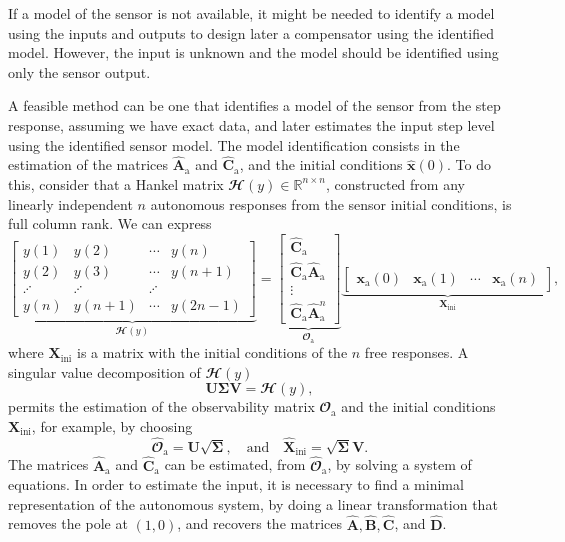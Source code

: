 If a model of the sensor is not available, it might be needed to identify a model using the inputs and outputs to design later a compensator using the identified model.
However, the input is unknown and the model should be identified using only the sensor output.


A feasible method can be one that identifies a model of the sensor from the step response, assuming we have exact data, and later estimates the input step level using the identified sensor model.
The model identification consists in the estimation of the matrices $\widehat{\mathbf{A}}_\text{a}$ and $\widehat{\mathbf{C}}_\text{a}$, and the initial conditions $\widehat{\mathbf{x}}(0)$.
To do this, consider that a Hankel matrix $\mathbfcal{H}({y}) \in \mathbb{R}^{n \times n}$, constructed from any linearly independent $n$ autonomous responses from the sensor initial conditions, is full column rank.
We can express 
\[ \underbrace{ \begin{bmatrix} y(1) & y(2) & \cdots & y(n) \\ y(2) & y(3) & \cdots & y(n+1) \\ \iddots & \iddots & \iddots \\ y(n) & y(n+1) & \cdots & y(2n-1) \end{bmatrix} }_{ \mathbfcal{H}({y}) }= \underbrace{ \begin{bmatrix} \widehat{\mathbf{C}}_\text{a} \\ \widehat{\mathbf{C}}_\text{a} \widehat{\mathbf{A}}_\text{a} \\ \vdots \\ \widehat{\mathbf{C}}_\text{a} \widehat{\mathbf{A}}_\text{a}^{n} \end{bmatrix} }_{ \mathbfcal{O}_\text{a} }  \underbrace{ \begin{bmatrix} \mathbf{x}_\text{a}(0) & \mathbf{x}_\text{a}(1) & \cdots & \mathbf{x}_\text{a}(n) \end{bmatrix} }_{ \mathbf{X}_\text{ini} } , \]
where $\mathbf{X}_\text{ini}$ is a matrix with the initial conditions of the $n$ free responses. 
A singular value decomposition of $\mathbfcal{H}({y})$ 
\[ \mathbf{U} \bm{\Sigma} \mathbf{V} = \mathbfcal{H}({y}), \]
permits the estimation of the observability matrix $\mathbfcal{O}_\text{a}$ and the initial conditions $\mathbf{X}_\text{ini}$, for example, by choosing
\[ \widehat{\mathbfcal{O}}_\text{a} = \mathbf{U} \sqrt{\bm{\Sigma}}, \quad \text{and} \quad \widehat{\mathbf{X}}_\text{ini} = \sqrt{\bm{\Sigma}} \mathbf{V} . \]
The matrices $\widehat{\mathbf{A}}_\text{a}$ and $\widehat{\mathbf{C}}_\text{a}$ can be estimated, from $\widehat{\mathbfcal{O}}_\text{a}$, by solving a system of equations.
In order to estimate the input, it is necessary to find a minimal representation of the autonomous system, by doing a linear transformation that removes the pole at $(1,0)$, and recovers the matrices $\widehat{\mathbf{A}}, \widehat{\mathbf{B}}, \widehat{\mathbf{C}}$, and $\widehat{\mathbf{D}}$.  


